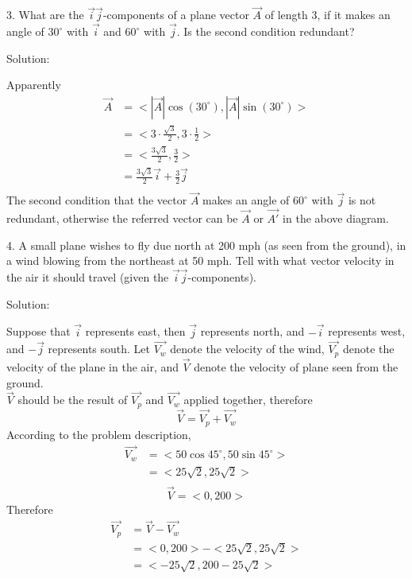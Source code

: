 \documentclass{article}
\begin{document}
3. What are the $\vec{i} \vec{j}$-components of a plane vector $\vec{A}$ of
length 3, if it makes an angle of $30^{\circ}$ with $\vec{i}$ and $60^{\circ}$
with $\vec{j}$. Is the second condition redundant?

Solution:


Apparently
\[
  \begin{split}
    \vec{A} &= <|\vec{A}|\cos(30^{\circ}), |\vec{A}|\sin(30^{\circ})> \\
            &= <3 \cdot \frac{\sqrt{3}}{2}, 3 \cdot \frac{1}{2}> \\
            &= <\frac{3\sqrt{3}}{2}, \frac{3}{2}> \\
            &= \frac{3\sqrt{3}}{2}\vec{i} + \frac{3}{2} \vec{j} \\
  \end{split}
\]
The second condition that the vector $\vec{A}$ makes an angle of $60^{\circ}$
with $\vec{j}$ is not redundant, otherwise the referred vector can be $\vec{A}$
or $\vec{A'}$ in the above diagram.

4. A small plane wishes to fly due north at 200 mph (as seen from the ground),
in a wind blowing from the northeast at 50 mph. Tell with what vector velocity
in the air it should travel (given the $\vec{i} \vec{j}$-components).

Solution:

Suppose that $\vec{i}$ represents east, then $\vec{j}$ represents north, and
$-\vec{i}$ represents west, and $-\vec{j}$ represents south. Let $\vec{V_w}$
denote the velocity of the wind, $\vec{V_p}$ denote the velocity of the plane in
the air, and $\vec{V}$ denote the velocity of plane seen from the ground. \\
$\vec{V}$ should be the result of $\vec{V_p}$ and $\vec{V_w}$ applied together,
therefore
\[
  \vec{V} = \vec{V_p} + \vec{V_w}
\]
According to the problem description,
\[
  \begin{split}
    \vec{V_w} &= <50\cos45^{\circ}, 50\sin45^{\circ}> \\
              &= <25\sqrt{2}, 25\sqrt{2}> \\
  \end{split}
\]
\[
  \vec{V} = <0, 200>
\]
Therefore
\[
  \begin{split}
    \vec{V_p} &= \vec{V} - \vec{V_w} \\
              &= <0, 200> - <25\sqrt{2}, 25\sqrt{2}> \\
              &= <-25\sqrt{2}, 200 - 25\sqrt{2}> \\
  \end{split}
\]
\end{document}
